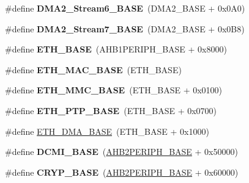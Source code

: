 \begin{DoxyCompactItemize}
\#define {\bfseries D\+M\+A2\+\_\+\+Stream6\+\_\+\+B\+A\+SE}~(D\+M\+A2\+\_\+\+B\+A\+SE + 0x0\+A0)
\item 
\mbox{\label{group___peripheral__memory__map_gaa9faa708ad2440d24eb1064cba9bb06d}} 
\#define {\bfseries D\+M\+A2\+\_\+\+Stream7\+\_\+\+B\+A\+SE}~(D\+M\+A2\+\_\+\+B\+A\+SE + 0x0\+B8)
\item 
\mbox{\label{group___peripheral__memory__map_gad965a7b1106ece575ed3da10c45c65cc}} 
\#define {\bfseries E\+T\+H\+\_\+\+B\+A\+SE}~(A\+H\+B1\+P\+E\+R\+I\+P\+H\+\_\+\+B\+A\+SE + 0x8000)
\item 
\mbox{\label{group___peripheral__memory__map_ga3cf7005808feb61bff1fee01e50a711a}} 
\#define {\bfseries E\+T\+H\+\_\+\+M\+A\+C\+\_\+\+B\+A\+SE}~(E\+T\+H\+\_\+\+B\+A\+SE)
\item 
\mbox{\label{group___peripheral__memory__map_ga4946f2b3b03f7998343ac1778fbcf725}} 
\#define {\bfseries E\+T\+H\+\_\+\+M\+M\+C\+\_\+\+B\+A\+SE}~(E\+T\+H\+\_\+\+B\+A\+SE + 0x0100)
\item 
\mbox{\label{group___peripheral__memory__map_gaa0f60b922aeb7275c785cbaa8f94ecf0}} 
\#define {\bfseries E\+T\+H\+\_\+\+P\+T\+P\+\_\+\+B\+A\+SE}~(E\+T\+H\+\_\+\+B\+A\+SE + 0x0700)
\item 
\#define \hyperlink{group___peripheral__memory__map_gace2114e1b37c1ba88d60f3e831b67e93}{E\+T\+H\+\_\+\+D\+M\+A\+\_\+\+B\+A\+SE}~(E\+T\+H\+\_\+\+B\+A\+SE + 0x1000)
\item 
\mbox{\label{group___peripheral__memory__map_ga55b794507e021135486de57129a2505c}} 
\#define {\bfseries D\+C\+M\+I\+\_\+\+B\+A\+SE}~(\hyperlink{group___peripheral__memory__map_gaeedaa71d22a1948492365e2cd26cfd46}{A\+H\+B2\+P\+E\+R\+I\+P\+H\+\_\+\+B\+A\+SE} + 0x50000)
\item 
\mbox{\label{group___peripheral__memory__map_ga019f3ad3b3212e56b45984efd8b8efef}} 
\#define {\bfseries C\+R\+Y\+P\+\_\+\+B\+A\+SE}~(\hyperlink{group___peripheral__memory__map_gaeedaa71d22a1948492365e2cd26cfd46}{A\+H\+B2\+P\+E\+R\+I\+P\+H\+\_\+\+B\+A\+SE} + 0x60000)

\end{DoxyCompactItemize}
